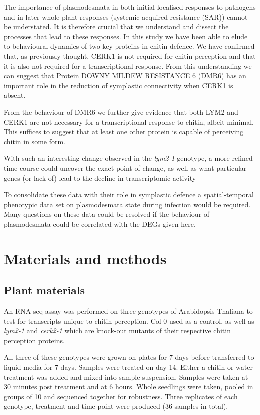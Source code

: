 \documentclass[../main.tex]{subfiles}
\begin{document}
The importance of plasmodesmata in both initial localised responses to pathogens
\cite{chevalChitinPerceptionPlasmodesmata2019} and in later whole-plant
responses (systemic acquired resistance (SAR))
\cite{chevalPlasmodesmalRegulationPlant2018} cannot be understated. It is
therefore crucial that we understand and dissect the processes that lead to
these responses. In this study we have been able to elude to behavioural
dynamics of two key proteins in chitin defence. We have confirmed that, as
previously thought, CERK1 is not required for chitin perception and that it is
also not required for a transcriptional response. From this understanding we can
suggest that Protein DOWNY MILDEW RESISTANCE 6 (DMR6) has an important role in
the reduction of symplastic connectivity when CERK1 is absent.

From the behaviour of DMR6 we further give evidence that both LYM2 and CERK1 are
not necessary for a transcriptional response to chitin, albeit minimal. This
suffices to suggest that at least one other protein is capable of perceiving
chitin in some form.

With such an interesting change observed in the \textit{lym2-1} genotype, a more
refined time-course could uncover the exact point of change, as well as what
particular genes (or lack of) lead to the decline in transcriptomic activity

To consolidate these data with their role in symplastic defence a
spatial-temporal phenotypic data set on plasmodesmata state during infection
would be required. Many questions on these data could be resolved if the
behaviour of plasmodesmata could be correlated with the DEGs given here. 



\section{Materials and methods}

\subsection{Plant materials}
An RNA-seq assay was performed on three genotypes of Arabidopsis Thaliana to
test for transcripts unique to chitin perception. Col-0 used as a control,
as well as \textit{lym2-1} and \textit{cerk2-1} which are knock-out mutants of
their respective chitin perception proteins. 

All three of these genotypes were grown on plates for 7 days before transferred
to liquid media for 7 days. Samples were treated on day 14. Either a chitin or
water treatment was added and mixed into sample suspension. Samples were taken
at 30 minutes post treatment and at 6 hours. Whole seedlings were taken, pooled
in groups of 10 and sequenced together for robustness. Three replicates of each
genotype, treatment and time point were produced (36 samples in total).
\end{document}
